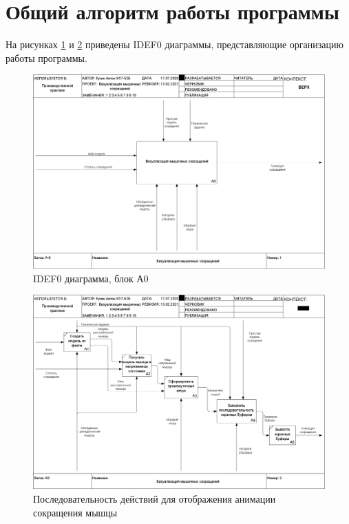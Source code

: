 \section{Общий алгоритм работы программы}
\label{sec:general}
На рисунках \ref{fig:01a-0} и \ref{fig:02a0} приведены IDEF0 диаграммы, представляющие организацию работы программы.
\begin{figure}[H]
	\centering
	\includegraphics[height=0.5\paperheight, angle=90]{images/01_A-0}
	\caption[IDEF0 диаграмма, блок А0]{IDEF0 диаграмма, блок А0}
	\label{fig:01a-0}
\end{figure}
\begin{figure}[H]
	\centering
	\includegraphics[height=0.5\paperheight, angle=90]{images/02_A0}
	\caption[Последовательность действий для отображения анимации сокращения мышцы]{Последовательность действий для отображения анимации сокращения мышцы}
	\label{fig:02a0}
\end{figure}

